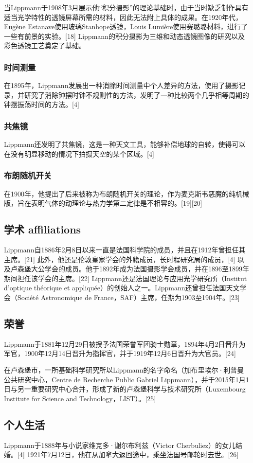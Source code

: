 当Lippmann于1908年3月展示他“积分摄影”的理论基础时，由于当时缺乏制作具有适当光学特性的透镜屏幕所需的材料，因此无法附上具体的成果。在1920年代，Eugène Estanave使用玻璃Stanhope透镜，Louis Lumière使用赛璐璐材料，进行了一些有前景的实验。[18] Lippmann的积分摄影为三维和动态透镜图像的研究以及彩色透镜工艺奠定了基础。
\subsubsection{时间测量}  
在1895年，Lippmann发展出一种消除时间测量中个人差异的方法，使用了摄影记录，并研究了消除钟摆时钟不规则性的方法，发明了一种比较两个几乎相等周期的钟摆振荡时间的方法。[4]
\subsubsection{共焦镜}  
Lippmann还发明了共焦镜，这是一种天文工具，能够补偿地球的自转，使得可以在没有明显移动的情况下拍摄天空的某个区域。[4]
\subsubsection{布朗随机开关}  
在1900年，他提出了后来被称为布朗随机开关的理论，作为麦克斯韦恶魔的纯机械版，旨在表明气体的动理论与热力学第二定律是不相容的。[19][20]
\subsection{学术 affiliations}
Lippmann自1886年2月8日以来一直是法国科学院的成员，并且在1912年曾担任其主席。[21] 此外，他还是伦敦皇家学会的外籍成员，长时程研究局的成员，[4] 以及卢森堡大公学会的成员。他于1892年成为法国摄影学会成员，并在1896至1899年期间担任该学会的主席。[22] Lippmann还是法国理论与应用光学研究所（Institut d'optique théorique et appliquée）的创始人之一。Lippmann还曾担任法国天文学会（Société Astronomique de France，SAF）主席，任期为1903至1904年。[23]
\subsection{荣誉}  
Lippmann于1881年12月29日被授予法国荣誉军团骑士勋章，1894年4月2日晋升为军官，1900年12月14日晋升为指挥官，并于1919年12月6日晋升为大官员。[24]

在卢森堡市，一所基础科学研究所以Lippmann的名字命名（加布里埃尔·利普曼公共研究中心，Centre de Recherche Public Gabriel Lippmann），并于2015年1月1日与另一重要研究中心合并，形成了新的卢森堡科学与技术研究所（Luxembourg Institute for Science and Technology，LIST）。[25]
\subsection{个人生活}
Lippmann于1888年与小说家维克多·谢尔布利兹（Victor Cherbuliez）的女儿结婚。[4] 1921年7月12日，他在从加拿大返回途中，乘坐法国号邮轮时去世。[26]  
